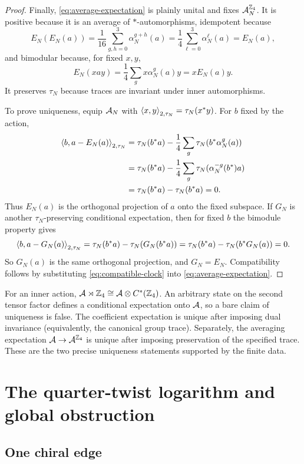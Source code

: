 \begin{proof}
Finally, \eqref{eq:average-expectation} is plainly unital and fixes
$\mathcal A_N^{\mathbb Z_4}$.  It is positive because it is an average of
$*$-automorphisms, idempotent because
\[
 E_N(E_N(a))
 =\frac1{16}\sum_{g,h=0}^3\alpha_N^{g+h}(a)
 =\frac14\sum_{\ell=0}^3\alpha_N^\ell(a)=E_N(a),
\]
and bimodular because, for fixed $x,y$,
\[
 E_N(xay)=\frac14\sum_gx\alpha_N^g(a)y=xE_N(a)y.
\]
It preserves $\tau_N$ because traces are invariant under inner
automorphisms.

To prove uniqueness, equip $\mathcal A_N$ with
$\left\langle x,y\right\rangle_{2,\tau_N}=\tau_N(x^*y)$.  For $b$ fixed by the action,
\[
\begin{aligned}
\left\langle b,a-E_N(a)\right\rangle_{2,\tau_N}
&=\tau_N(b^*a)
 -\frac14\sum_g\tau_N(b^*\alpha_N^g(a))\\
&=\tau_N(b^*a)
 -\frac14\sum_g\tau_N(\alpha_N^{-g}(b^*)a)\\
&=\tau_N(b^*a)-\tau_N(b^*a)=0.
\end{aligned}
\]
Thus $E_N(a)$ is the orthogonal projection of $a$ onto the fixed
subspace.  If $G_N$ is another $\tau_N$-preserving conditional
expectation, then for fixed $b$ the bimodule property gives
\[
\left\langle b,a-G_N(a)\right\rangle_{2,\tau_N}
=\tau_N(b^*a)-\tau_N(G_N(b^*a))
=\tau_N(b^*a)-\tau_N(b^*G_N(a))=0.
\]
So $G_N(a)$ is the same orthogonal projection, and $G_N=E_N$.
Compatibility follows by substituting
\eqref{eq:compatible-clock} into \eqref{eq:average-expectation}.
\end{proof}

\begin{remark}
For an inner action,
$\mathcal A\rtimes\mathbb Z_4\cong\mathcal A\otimes C^*(\mathbb Z_4)$.
An arbitrary state on the second tensor factor defines a conditional
expectation onto $\mathcal A$, so a bare claim of uniqueness is false.
The coefficient expectation is unique after imposing dual invariance
(equivalently, the canonical group trace).  Separately, the averaging
expectation $\mathcal A\to\mathcal A^{\mathbb Z_4}$ is unique after imposing preservation
of the specified trace.  These are the two precise uniqueness statements
supported by the finite data.
\end{remark}

\section{The quarter-twist logarithm and global obstruction}
\label{sec:global}

\subsection{One chiral edge}

